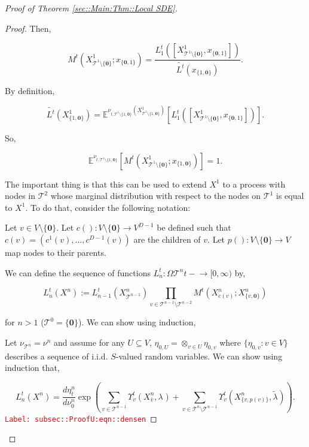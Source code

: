 \documentclass[12pt]{article}
\newcommand{\mb}{\mathbb}
\newcommand{\mc}{\mathcal}
\newcommand{\ra}{\rightarrow}
\newcommand{\ov}{\overline}
\newcommand{\tr}{\textcolor{red}}
\newcommand{\labe}[1]{\tr{\texttt{Label: #1}}}
\newcommand{\ind}{\hspace{24pt}}
\newcommand{\exmu}[2]{\mb{E}^{#1}\left[#2\right]}	%
\renewcommand{\root}{\mathbf{0}}				%
\renewcommand{\v}{v}							%
\renewcommand{\U}{U}							%
\renewcommand{\S}{S}							%
\renewcommand{\t}{t}							%
\newcommand{\cl}{\ov}							%
\newcommand{\degr}{D}								%
\newcommand{\pup}[1]{^{#1}}							%
\newcommand{\tree}{\mc{T}}							%
\newcommand{\V}{V}									%
\newcommand{\numb}{n}								%
\newcommand{\xvts}[2]{x_{#1}{#2}}					%
\newcommand{\rxvtsn}[3]{X_{#1}^{#3}{#2}}			%
\newcommand{\mm}[3]{\nu_{#2#1}^{#3}}						%
\newcommand{\mmm}[3]{\eta_{#2#1}^{#3}}						%
\newcommand{\rate}[1]{\lambda_{#1}}					%
\newcommand{\crate}[2]{\alt{\lambda}_{#1}^{#2}}		%
\newcommand{\alt}{\widetilde}						%
\newcommand{\dense}[2]{L_{#1}^{#2}}				%
\newcommand{\cdense}[2]{M_{#1}^{#2}}			%
\newcommand{\ds}[2]{\Upsilon_{#1}^{#2}}			%
\renewcommand{\c}[1]{c(#1)}						%
\newcommand{\p}[1]{p(#1)}						%
\begin{document}
\begin{proof}[Proof of Theorem \ref{sec::Main:Thm::Local SDE}]
\begin{proof}
Then,

\[\cdense{}{\t}(\rxvtsn{\tree\pup{1}\setminus\{\root\}}{}{1};\xvts{\{\root,1\}}{}) = \frac{\dense{1}{\t}([\rxvtsn{\tree\pup{1}\setminus\{\root\}}{}{1},\xvts{\{\root,1\}}{}])}{\alt{\dense{}{\t}}(\xvts{\{1,\root\}}{})}.\]

By definition,

\[\alt{\dense{}{\t}}(\rxvtsn{\{1,\root\}}{}{1}) = \exmu{\mm{\tree\pup{1}\setminus\{1,\root\}}{\t,}{}(\rxvtsn{\tree\pup{1}\setminus\{1,\root\}}{}{1})}{\dense{1}{\t}([\rxvtsn{\tree\pup{1}\setminus\{\root\}}{}{1},\xvts{\{\root,1\}}{}])}.\]

So,

\[\exmu{\mm{\tree\pup{1}\setminus\{1,\root\}}{\t,}{}}{\cdense{}{\t}(\rxvtsn{\tree\pup{1}\setminus\{\root\}}{}{1};\xvts{\{1,\root\}}{})} = 1.\]

The important thing is that this can be used to extend \(\rxvtsn{}{}{1}\) to a process with nodes in \(\tree\pup{2}\) whose marginal distribution with respect to the nodes on \(\tree\pup{1}\) is equal to \(\rxvtsn{}{}{1}\). To do that, consider the following notation:

\ind Let \(\v \in \V\setminus\{\root\}\). Let \(\c{}:\V\setminus\{\root\} \ra \V^{\degr-1}\) be defined such that \(\c{\v} = (c^1(\v),\dots,c^{\degr-1}(\v))\) are the children of \(\v\). Let \(\p{}:\V\setminus\{\root\}\ra\V\) map nodes to their parents.

\ind We can define the sequence of functions \(\dense{\numb}{\t}: \Omega{\tree\pup{\numb}}{\t-} \ra [0,\infty)\) by,

\[\dense{\numb}{\t}(\rxvtsn{}{}{\numb}) := \dense{\numb-1}{\t}(\rxvtsn{\tree\pup{\numb-1}}{}{\numb})\prod_{\v\in \tree\pup{\numb-1}\setminus\tree\pup{\numb-2}} \cdense{}{\t}(\rxvtsn{\c{\v}}{}{\numb};\rxvtsn{\{\v,\root\}}{}{\numb})\]

for \(\numb > 1\) (\(\tree\pup{0} = \{\root\}\)). We can show using induction,

\ind Let \(\mm{\tree\pup{\numb}}{}{} = \mm{}{}{\numb}\) and assume for any \(\U \subseteq \V\), \(\mmm{\U}{0,}{} = \otimes_{\v\in\U}\mmm{\v}{0,}{}\) where \(\{\mmm{\v}{0,}{}:\v\in\V\}\) describes a sequence of i.i.d. \(\S\)-valued random variables. We can show using induction that,

\begin{equation}
\dense{\numb}{\t}(\rxvtsn{}{}{\numb}) = \frac{d\mmm{}{\t}{\numb}}{d\mm{}{0}{\numb}}\exp\left(\sum_{\v\in\tree\pup{\numb-1}}\ds{\v}{\t}(\rxvtsn{\cl{\v}}{}{\numb},\rate{}) + \sum_{\v\in\tree\pup{\numb}\setminus\tree\pup{\numb-1}} \ds{\v}{\t}(\rxvtsn{\{v,\p{\v}\}}{}{\numb},\crate{}{})\right).
\label{subsec::ProofU:eqn::densen}
\end{equation}
\labe{subsec::ProofU:eqn::densen}


\end{proof}
\end{proof}
\end{document}
